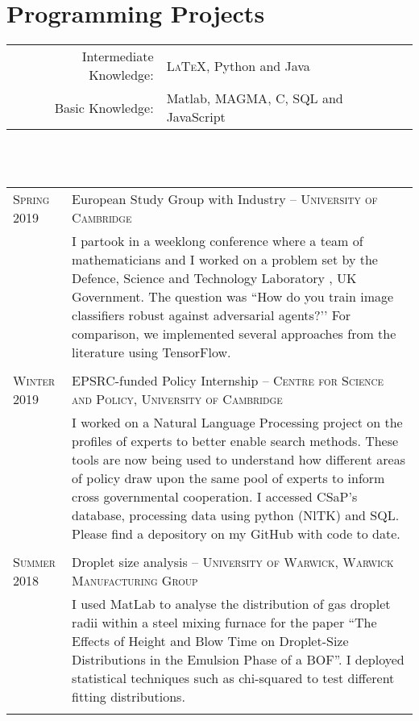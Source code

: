 \documentclass[a4paper,10pt]{article}
\begin{document}
\section{Programming Projects}
\begin{tabular}{rl}
	Intermediate Knowledge:&  \textsc{LaTeX}, Python and Java\\
	Basic Knowledge:& Matlab, \textsc{MAGMA}, C, SQL and JavaScript\\
\end{tabular}\\
\vspace{0.1 in}\\
\begin{tabular}{p{2.25cm}|p{15cm}}
	\textsc{Spring 2019} & European Study Group with Industry -- \textsc{University of Cambridge} \\&\footnotesize{I partook in a weeklong conference where a team of mathematicians and I worked on a problem set by the Defence, Science and Technology Laboratory , UK Government. The question was ``How do you train image classifiers robust against adversarial agents?’’ For comparison, we implemented several approaches from the literature using TensorFlow.}\\\multicolumn{2}{c}{} \\
	\textsc{Winter 2019} & EPSRC-funded Policy Internship -- \textsc{Centre for Science and Policy, University of Cambridge}\\&\footnotesize{I worked on a Natural Language Processing project on the profiles of experts to better enable search methods. These tools are now being used to understand how different areas of policy draw upon the same pool of experts to inform cross governmental cooperation. I accessed CSaP's database, processing data using python (NlTK) and SQL. Please find a depository on my GitHub with code to date.}\\\multicolumn{2}{c}{} \\
	\textsc{Summer 2018}& Droplet size analysis -- \textsc{University of Warwick, Warwick Manufacturing Group}\\&\footnotesize{I used MatLab to analyse the distribution of gas droplet radii within a steel mixing furnace for the paper ``The Effects of Height and Blow Time on Droplet-Size Distributions in the Emulsion Phase of a BOF''. I deployed statistical techniques such as chi-squared to test different fitting distributions.}\\\multicolumn{2}{c}{} 
\end{tabular}
\end{document}
